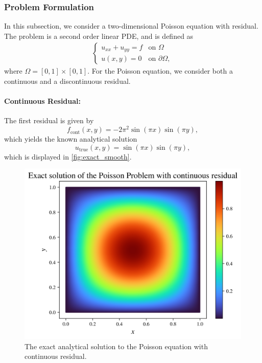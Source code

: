 \subsubsection{Problem Formulation}
In this subsection, we consider a two-dimensional Poisson equation with residual.
The problem is a second order linear PDE, and is defined as
\begin{align}\label{eq:poisson}
\begin{cases}
    u_{xx}+u_{yy} = f &\text{on } \Omega \\
    u(x,y) = 0 &\text{on } \partial\Omega,
\end{cases}
\end{align}
where $\Omega = [0,1] \times [0,1]$.
For the Poisson equation, we consider both a continuous and a discontinuous residual.

\paragraph{Continuous Residual:}
The first residual is given by
\begin{equation}\label{eq:continuous_poisson}
    f_{\text{cont}}(x,y)= -2\pi^2\sin(\pi x) \sin(\pi y),
\end{equation}
which yields the known analytical solution
\begin{equation*}
    u_{\text{true}}(x,y)=\sin(\pi x) \sin(\pi y),
\end{equation*}
which is displayed in \autoref{fig:exact_smooth}.

\begin{figure}[h]
    \centering
    \includegraphics[width=0.9\linewidth]{Project1XPINNs/figures/Poisson/smooth_Poisson_true.png}
    \caption{The exact analytical solution to the Poisson equation with continuous residual.}
    \label{fig:exact_smooth}
\end{figure}

